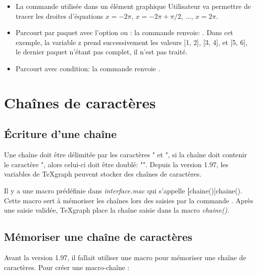 \begin{itemize}
\begin{itemize}
    \item La commande  utilisée dans un élément graphique Utilisateur va permettre de tracer les droites d'équations $x=-2\pi$, $x=-2\pi+\pi/2$, ..., $x=2\pi$.

     \item Parcourt par paquet avec l'option  ou : la commande  renvoie: . Dans cet exemple, la variable z prend successivement les valeurs [1, 2], [3, 4], et [5, 6], le dernier paquet n'étant pas complet, il n'est pas traité.

    \item Parcourt avec condition: la commande  renvoie \res{[5,9]}.
    \end{itemize}
\end{itemize}


\section{Chaînes de caractères}\label{chaine}

\subsection{Écriture d'une chaîne}

Une chaîne doit être délimitée par les caractères " et ", si la chaîne doit contenir le caractère ", alors celui-ci doit être doublé: "". Depuis la version 1.97, les variables de TeXgraph peuvent stocker des chaînes de caractères.

Il y a une macro prédéfinie dans \textit{interface.mac} qui s'appelle \textbf[chaine()]{chaine()}. Cette macro sert à mémoriser les chaînes lors des saisies par la commande . Après une saisie validée, TeXgraph place la chaîne saisie dans la macro \textsl{chaine()}.

 
\subsection{Mémoriser une chaîne de caractères}\label{memochaine}


Avant la version 1.97, il fallait utiliser une macro pour mémoriser une chaîne de caractères. Pour créer une macro-chaîne :

